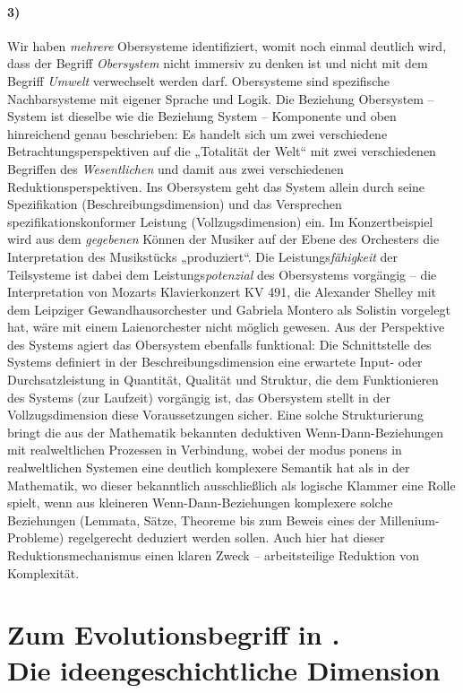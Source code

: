 \documentclass[11pt,a4paper]{article}
\begin{document}
\paragraph{3)}
Wir haben \emph{mehrere} Obersysteme identifiziert, womit noch einmal deutlich
wird, dass der Begriff \emph{Obersystem} nicht immersiv zu denken ist und
nicht mit dem Begriff \emph{Umwelt} verwechselt werden darf. Obersysteme sind
spezifische Nachbarsysteme mit eigener Sprache und Logik. Die Beziehung
Obersystem -- System ist dieselbe wie die Beziehung System -- Komponente und
oben hinreichend genau beschrieben: Es handelt sich um zwei verschiedene
Betrachtungsperspektiven auf die „Totalität der Welt“ mit zwei verschiedenen
Begriffen des \emph{Wesentlichen} und damit aus zwei verschiedenen
Reduktionsperspektiven. Ins Obersystem geht das System allein durch seine
Spezifikation (Beschreibungsdimension) und das Versprechen
spezifikationskonformer Leistung (Vollzugsdimension) ein. Im Konzertbeispiel
wird aus dem \emph{gegebenen} Können der Musiker auf der Ebene des Orchesters
die Interpretation des Musikstücks „produziert“.  Die
Leistungs\emph{fähigkeit} der Teilsysteme ist dabei dem
Leistungs\emph{potenzial} des Obersystems vorgängig -- die Interpretation von
Mozarts Klavierkonzert KV 491, die Alexander Shelley mit dem Leipziger
Gewandhausorchester und Gabriela Montero als Solistin vorgelegt hat, wäre mit
einem Laienorchester nicht möglich gewesen. Aus der Perspektive des Systems
agiert das Obersystem ebenfalls funktional: Die Schnittstelle des Systems
definiert in der Beschreibungsdimension eine erwartete Input- oder
Durchsatzleistung in Quantität, Qualität und Struktur, die dem Funktionieren
des Systems (zur Laufzeit) vorgängig ist, das Obersystem stellt in der
Vollzugsdimension diese Voraussetzungen sicher. Eine solche Strukturierung
bringt die aus der Mathematik bekannten deduktiven Wenn-Dann-Beziehungen mit
realweltlichen Prozessen in Verbindung, wobei der modus ponens in
realweltlichen Systemen eine deutlich komplexere Semantik hat als in der
Mathematik, wo dieser bekanntlich ausschließlich als logische Klammer eine
Rolle spielt, wenn aus kleineren Wenn-Dann-Beziehungen komplexere solche
Beziehungen (Lemmata, Sätze, Theoreme bis zum Beweis eines der
Millenium-Probleme) regelgerecht deduziert werden sollen.  Auch hier hat
dieser Reduktionsmechanismus einen klaren Zweck -- arbeitsteilige Reduktion
von Komplexität.

\section{Zum Evolutionsbegriff in \cite{TESE2018}.\\ Die ideengeschichtliche
  Dimension}
\end{document}
